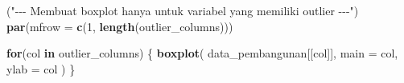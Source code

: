 \documentclass[
  12pt,
]{article}
\newenvironment{Shaded}{\begin{snugshade}}{\end{snugshade}}
\newcommand{\AttributeTok}[1]{\textcolor[rgb]{0.13,0.29,0.53}{#1}}
\newcommand{\ControlFlowTok}[1]{\textcolor[rgb]{0.13,0.29,0.53}{\textbf{#1}}}
\newcommand{\DecValTok}[1]{\textcolor[rgb]{0.00,0.00,0.81}{#1}}
\newcommand{\FunctionTok}[1]{\textcolor[rgb]{0.13,0.29,0.53}{\textbf{#1}}}
\newcommand{\NormalTok}[1]{#1}
\newcommand{\StringTok}[1]{\textcolor[rgb]{0.31,0.60,0.02}{#1}}
\begin{document}
\begin{Shaded}
\begin{Highlighting}[]
\NormalTok{(}\StringTok{"{-}{-}{-} Membuat boxplot hanya untuk variabel yang memiliki outlier {-}{-}{-}"}\NormalTok{)}
\FunctionTok{par}\NormalTok{(}\AttributeTok{mfrow =} \FunctionTok{c}\NormalTok{(}\DecValTok{1}\NormalTok{, }\FunctionTok{length}\NormalTok{(outlier\_columns)))}

\ControlFlowTok{for}\NormalTok{(col }\ControlFlowTok{in}\NormalTok{ outlier\_columns) \{}
  \FunctionTok{boxplot}\NormalTok{(}
\NormalTok{    data\_pembangunan[[col]],}
    \AttributeTok{main =}\NormalTok{ col,}
    \AttributeTok{ylab =}\NormalTok{ col}
\NormalTok{  )}
\NormalTok{\}}
\end{Highlighting}
\end{Shaded}

\begin{verbatim}
\end{verbatim}
\end{document}
